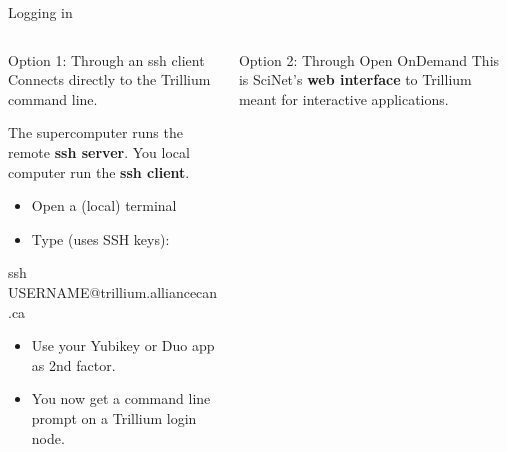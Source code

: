 \documentclass[
  10pt,
  ignorenonframetext,
  aspectratio=169]{beamer}
\newenvironment{Shaded}{\begin{snugshade}}{\end{snugshade}}
\newcommand{\FunctionTok}[1]{\textcolor[rgb]{0.94,0.94,0.56}{#1}}
\newcommand{\NormalTok}[1]{\textcolor[rgb]{0.80,0.80,0.80}{#1}}
\begin{document}
\begin{frame}[fragile]{Logging in}
\label{logging-in}
\begin{columns}[T]
\begin{column}{0.47\linewidth}\setlength{\parskip}{0.5\baselineskip}
\begin{block}{Option 1: Through an ssh client}\setlength{\parskip}{0.5\baselineskip}
\label{option-1-through-an-ssh-client}
Connects directly to the Trillium command line.

\pause

The supercomputer runs the remote \textbf{ssh server}. You local computer run the \textbf{ssh client}.

\pause

\begin{itemize}
\item
  Open a (local) terminal

  \pause
\item
  Type (uses SSH keys):\\
  \small
\end{itemize}

\begin{Shaded}
\begin{Highlighting}[]
   \FunctionTok{ssh}\NormalTok{ USERNAME@trillium.alliancecan.ca}
\end{Highlighting}
\end{Shaded}

\pause

\begin{itemize}
\item
  Use your Yubikey or Duo app as 2nd factor.

  \pause
\item
  You now get a command line prompt on a Trillium login node.
\end{itemize}

\vspace{\baselineskip}
\end{block}
\end{column}

\begin{column}{0.47\linewidth}\setlength{\parskip}{0.5\baselineskip}
\pause

\begin{block}{Option 2: Through Open OnDemand}\setlength{\parskip}{0.5\baselineskip}
\label{option-2-through-open-ondemand}
This is SciNet's \textbf{web interface} to Trillium meant for interactive applications.


\end{block}
\end{column}
\end{columns}
\end{frame}
\end{document}
